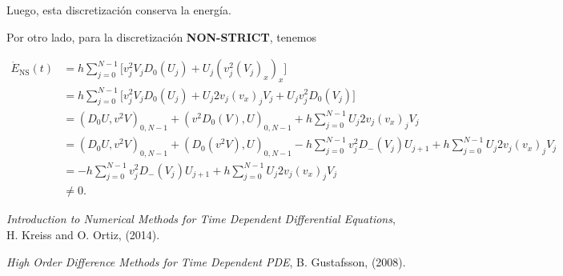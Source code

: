 \documentclass[12pt]{article}
\begin{document}
Luego, esta discretizaci\'on conserva la energ\'ia.

Por otro lado, para la discretizaci\'on \textbf{NON-STRICT}, tenemos 

\begin{align}
\dot{E}_{\mathrm{NS}}(t) &= h \sum_{j=0}^{N-1} \bigg[v_j^2 V_j D_0(U_j) + U_j (v_j^2 (V_j)_x)_x\bigg] \nonumber \\
 &= h \sum_{j=0}^{N-1} \bigg[v_j^2 V_j D_0(U_j) + U_j 2 v_j (v_x)_j V_j + U_j v_j^2 D_0(V_j)\bigg] \nonumber \\
&= (D_0 U, v^2V)_{0,N-1} + (v^2D_0( V), U)_{0,N-1} +  h \sum_{j=0}^{N-1} U_j 2 v_j (v_x)_j V_j \nonumber\\
&= (D_0 U, v^2V)_{0,N-1} + (D_0(v^2 V), U)_{0,N-1} - h\sum_{j=0}^{N-1} v_j^2 D_-(V_j) U_{j+1} + h \sum_{j=0}^{N-1} U_j 2 v_j (v_x)_j V_j \nonumber\\
&= - h\sum_{j=0}^{N-1} v_j^2 D_-(V_j) U_{j+1} + h \sum_{j=0}^{N-1} U_j 2 v_j (v_x)_j V_j \nonumber\\
&\neq 0.
\end{align}


\begin{thebibliography}{1}

 {\em Introduction to Numerical Methods for Time Dependent Differential Equations}, H. Kreiss and O. Ortiz, (2014).

 {\em High Order Difference Methods for Time Dependent PDE}, B. Gustafsson, (2008).

\end{thebibliography}
\end{document}
